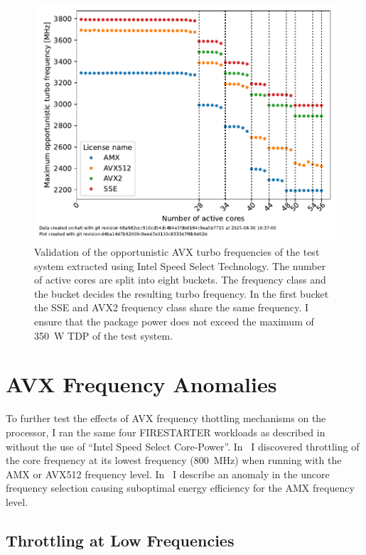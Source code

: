 \begin{figure}[]
    \centering
    \includegraphics[width=0.8\columnwidth]{fig/avx-frequency-license-bands-validation/validate-avx-frequency-license-bands.pdf}
    \caption{\label{fig:validated-p0n-frequencies}Validation of the opportunistic AVX turbo frequencies of the test system extracted using Intel Speed Select Technology.
    The number of active cores are split into eight buckets. The frequency class and the bucket decides the resulting turbo frequency.
    In the first bucket the SSE and AVX2 frequency class share the same frequency. I ensure that the package power does not exceed the maximum of \SI{350}{\watt} TDP of the test system.}
\end{figure}

\section{AVX Frequency Anomalies}
\label{sec:avx-anomalies}

To further test the effects of AVX frequency thottling mechanisms on the processor, I ran the same four FIRESTARTER workloads as described in~ without the use of ``Intel Speed Select Core-Power''.
In~ I discovered throttling of the core frequency at its lowest frequency (\SI{800}{\MHz}) when running with the AMX or AVX512 frequency level.
In~ I describe an anomaly in the uncore frequency selection causing suboptimal energy efficiency for the AMX frequency level.

\subsection{Throttling at Low Frequencies}
\label{sec:avx-anomalies-low-freq}

